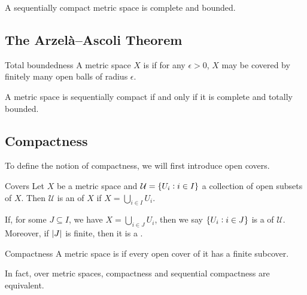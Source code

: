 \documentclass{styles/tufte}
\begin{document}
  \begin{lemma}{}{}
    A sequentially compact metric space is complete and bounded.
  \end{lemma}


\subsection{The Arzel\`a--Ascoli Theorem}

  \begin{definition}{Total boundedness}{}
    A metric space $X$ is  if for any $\epsilon > 0$, $X$ may be covered by finitely many open balls of radius $\epsilon$.
  \end{definition}
  
  \begin{theorem}{}{}
    A metric space is sequentially compact if and only if it is complete and totally bounded.
  \end{theorem}


\subsection{Compactness}

  To define the notion of compactness, we will first introduce open covers.
  
  \begin{definition}{Covers}{}
    Let $X$ be a metric space and $\mathcal{U} = \set{U_i: i \in I}$ a collection of open subsets of $X$. Then $\mathcal{U}$ is an  of $X$ if $X = \bigcup_{i \in I} U_i$.
    
    If, for some $J \subseteq I$, we have $X = \bigcup_{i \in J} U_i$, then we say $\set{U_i: i \in J}$ is a  of $\mathcal{U}$. Moreover, if $\abs{J}$ is finite, then it is a .
  \end{definition}
  
  \begin{definition}{Compactness}{}
    A metric space is  if every open cover of it has a finite subcover.
  \end{definition}
  
  In fact, over metric spaces, compactness and sequential compactness are equivalent.
  
\end{document}
